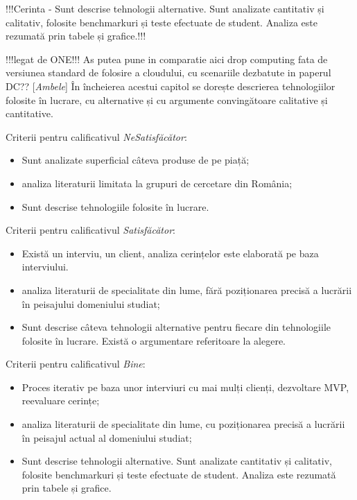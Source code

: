 \documentclass[12pt,a4paper]{report}
\newcommand{\worktype}[1]{[\textit{#1}] }
\newcommand{\dezvoltare}{\worktype{Dezvoltare de produs}}
\newcommand{\cercetare}{\worktype{Cercetare}}
\newcommand{\ambele}{\worktype{Ambele}}
\begin{document}
!!!Cerinta - Sunt descrise tehnologii alternative. Sunt analizate cantitativ și calitativ, folosite benchmarkuri și teste efectuate de student. Analiza este rezumată prin tabele și grafice.!!!

!!!legat de ONE!!!
As putea pune in comparatie aici drop computing fata de versiunea standard de folosire a cloudului, cu scenariile dezbatute in paperul DC??
\ambele În încheierea acestui capitol se dorește descrierea tehnologiilor folosite în lucrare, cu alternative și cu argumente convingătoare calitative și cantitative.  


Criterii pentru calificativul \textit{Ne\textit{Satisfăcător}}: 
\begin{itemize}
	\item \dezvoltare Sunt analizate superficial câteva produse de pe piață; 
	\item \cercetare analiza literaturii limitata la grupuri de cercetare din România;
	\item \ambele Sunt descrise tehnologiile folosite în lucrare. 
\end{itemize}

Criterii pentru calificativul \textit{Satisfăcător}:
\begin{itemize}
	\item \dezvoltare Există un interviu, un client, analiza cerințelor este elaborată pe baza interviului.
	\item \cercetare analiza literaturii de specialitate din lume, fără poziționarea precisă a lucrării în peisajului domeniului studiat;
	\item \ambele Sunt descrise câteva tehnologii alternative pentru fiecare din tehnologiile folosite în lucrare. Există o argumentare referitoare la alegere.
\end{itemize}

Criterii pentru calificativul \textit{Bine}:
\begin{itemize}
	\item \dezvoltare Proces iterativ pe baza unor interviuri cu mai mulți clienți, dezvoltare MVP, reevaluare cerințe;
	\item \cercetare analiza literaturii de specialitate din lume, cu poziționarea precisă a lucrării în peisajul actual al domeniului studiat; 
	\item \ambele Sunt descrise tehnologii alternative. Sunt analizate cantitativ și calitativ, folosite benchmarkuri și teste efectuate de student. Analiza este rezumată prin tabele și grafice.
\end{itemize}
\end{document}
